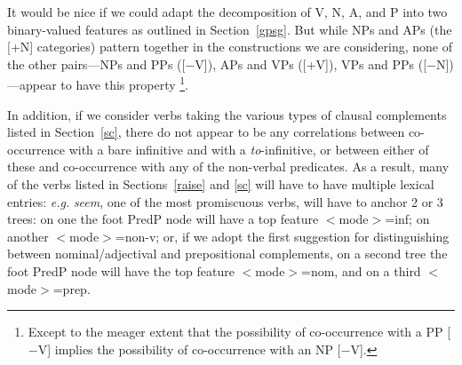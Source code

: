 It would be nice if we could adapt the decomposition of V, N, A, and P
into two binary-valued features as outlined in Section~\ref{gpsg}.  But
while NPs and APs (the [+N] categories) pattern together in the
constructions we are considering, none of the other pairs---NPs and PPs
([$-$V]), APs and VPs ([+V]), VPs and PPs ([$-$N])---appear to have this
property%
%
\footnote{Except to the meager extent that the possibility of co-occurrence
with a PP [$-$V] implies the possibility of co-occurrence with an NP
[$-$V].}. 
%

In addition, if we consider verbs taking the various types of clausal
complements listed in Section~\ref{sc}, there do not appear to be any
correlations between co-occurrence with a bare infinitive and with a
{\em to\/}-infinitive, or between either of these and co-occurrence with
any of the non-verbal predicates.  As a result, many of the verbs listed
in Sections~\ref{raise} and \ref{sc} will have to have multiple lexical
entries: {\em e.g.\/} {\em seem\/}, one of the most promiscuous verbs, will have
to anchor 2 or 3 trees: on one the foot PredP node will have a top
feature $<$mode$>$=inf; on another $<$mode$>$=non-v; or, if we adopt the
first suggestion for distinguishing between nominal/adjectival and
prepositional complements, on a second tree the foot PredP node will
have the top feature $<$mode$>$=nom, and on a third $<$mode$>$=prep.

